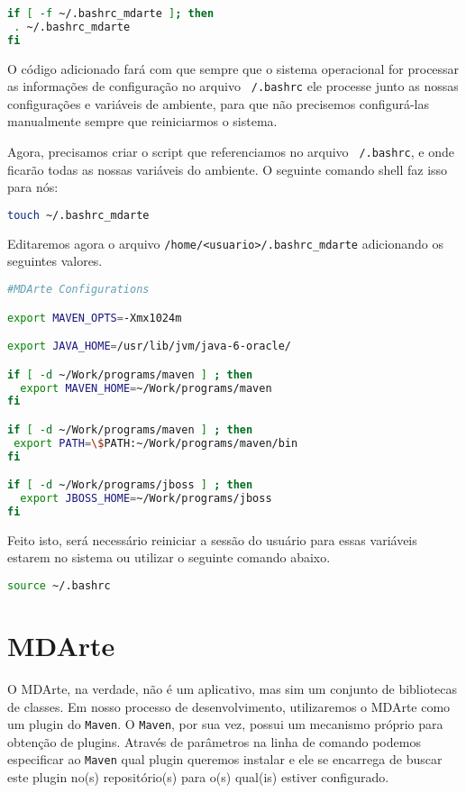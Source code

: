 \begin{lstlisting}[language=bash]
if [ -f ~/.bashrc_mdarte ]; then
 . ~/.bashrc_mdarte
fi
\end{lstlisting}

O código adicionado fará com que sempre que o sistema operacional for processar
as informações de configuração no arquivo \texttt{~/.bashrc} ele processe junto
as nossas configurações e variáveis de ambiente, para que não precisemos
configurá-las manualmente sempre que reiniciarmos o sistema. 

Agora, precisamos criar o script que referenciamos no arquivo
\texttt{~/.bashrc}, e onde ficarão todas as nossas variáveis do ambiente. O
seguinte comando shell faz isso para nós:

\begin{lstlisting}[language=bash]
touch ~/.bashrc_mdarte
\end{lstlisting}
	
Editaremos agora o arquivo \texttt{/home/<usuario>/.bashrc\_mdarte} adicionando
os seguintes valores.

\begin{lstlisting}[language=bash]
#MDArte Configurations

export MAVEN_OPTS=-Xmx1024m

export JAVA_HOME=/usr/lib/jvm/java-6-oracle/

if [ -d ~/Work/programs/maven ] ; then
  export MAVEN_HOME=~/Work/programs/maven
fi

if [ -d ~/Work/programs/maven ] ; then
 export PATH=\$PATH:~/Work/programs/maven/bin
fi

if [ -d ~/Work/programs/jboss ] ; then
  export JBOSS_HOME=~/Work/programs/jboss
fi
\end{lstlisting}

Feito isto, será necessário reiniciar a sessão do usuário para essas variáveis
estarem no sistema ou utilizar o seguinte comando abaixo.

\begin{lstlisting}[language=bash]
source ~/.bashrc
\end{lstlisting}

\section{MDArte}

O MDArte, na verdade, não é um aplicativo, mas sim um conjunto de bibliotecas de
classes. Em nosso processo de desenvolvimento, utilizaremos o MDArte como um
plugin do \texttt{Maven}. O \texttt{Maven}, por sua vez, possui um mecanismo
próprio para obtenção de plugins. Através de parâmetros na linha de comando
podemos especificar ao \texttt{Maven} qual plugin queremos instalar e ele se
encarrega de buscar este plugin no(s) repositório(s) para o(s) qual(is) estiver
configurado.

